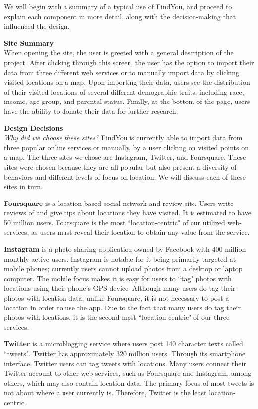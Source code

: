 We will begin with a summary of a typical use of FindYou, and proceed to explain each component in more detail, along with the decision-making that influenced the design. 

\textbf{Site Summary} \\
When opening the site, the user is greeted with a general description of the project. After clicking through this screen, the user has the option to import their data from three different web services or to manually import data by clicking visited locations on a map. Upon importing their data, users see the distribution of their visited locations of several different demographic traits, including race, income, age group, and parental status. Finally, at the bottom of the page, users have the ability to donate their data for further research.

\textbf{Design Decisions} \\
\emph{Why did we choose these sites?}
FindYou is currently able to import data from three popular online services or manually, by a user clicking on visited points on a map. The three sites we chose are Instagram, Twitter, and Foursquare. These sites were chosen because they are all popular but also present a diversity of behaviors and different levels of focus on location. We will discuss each of these sites in turn.

\textbf{Foursquare} is a location-based social network and review site. 
Users write reviews of and give tips about locations they have visited. 
It is estimated to have 50 million users. 
Foursquare is the most ``location-centric" of our utilized web-services, as users must reveal their location to obtain any value from the service.

\textbf{Instagram} is a photo-sharing application owned by Facebook with 400 million monthly active users. 
Instagram is notable for it being primarily targeted at mobile phones; currently users cannot upload photos from a desktop or laptop computer.
The mobile focus makes it is easy for users to ``tag" photos with locations using their phone's GPS device. 
Although many users do tag their photos with location data, unlike Foursquare, it is not necessary to post a location in order to use the app.
Due to the fact that many users do tag their photos with locations, it is the second-most ``location-centric" of our three services.

\textbf{Twitter} is a microblogging service where users post 140 character texts called ``tweets". Twitter has approximately 320 million users. Through its smartphone interface, Twitter users can tag tweets with locations. Many users connect their Twitter account to other web services, such as Foursquare and Instagram, among others, which may also contain location data. The primary focus of most tweets is not about where a user currently is. Therefore, Twitter is the least location-centric. 

